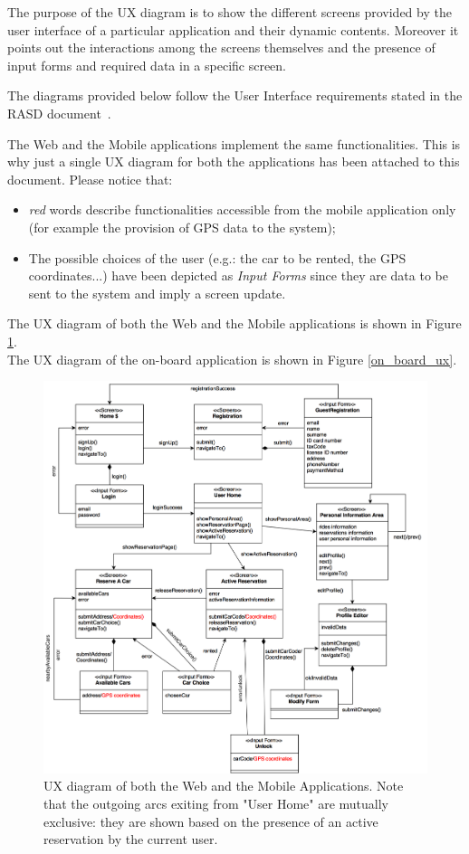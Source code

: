 The purpose of the UX diagram is to show the different screens provided by the user interface of a particular application and their dynamic contents. Moreover it points out the interactions among the screens themselves and the presence of input forms and required data in a specific screen.

The diagrams provided below follow the User Interface requirements stated in the RASD document~\cite{rasd}.

The Web and the Mobile applications implement the same functionalities. This is why just a single UX diagram for both the applications has been attached to this document. Please notice that:
\begin{itemize}
\item \emph{\color{red} red} words describe functionalities accessible from the mobile application only (for example the provision of GPS data to the system);
\item The possible choices of the user (e.g.: the car to be rented, the GPS coordinates...) have been depicted as \emph{Input Forms} since they are data to be sent to the system and imply a screen update.
\end{itemize}
The UX diagram of both the Web and the Mobile applications is shown in Figure \ref{web_mobile_ux}. \\
The UX diagram of the on-board application is shown in Figure \ref{on_board_ux}.

\begin{figure}[H]
\begin{center}
		\includegraphics[width=\textwidth]{./user_interface_design/diagrams/web_mobile_ux.png}
		\caption{UX diagram of both the Web and the Mobile Applications. Note that the outgoing arcs exiting from "User Home" are mutually exclusive: they are shown based on the presence of an active reservation by the current user.}
		\label{web_mobile_ux}
\end{center}
\end{figure}

